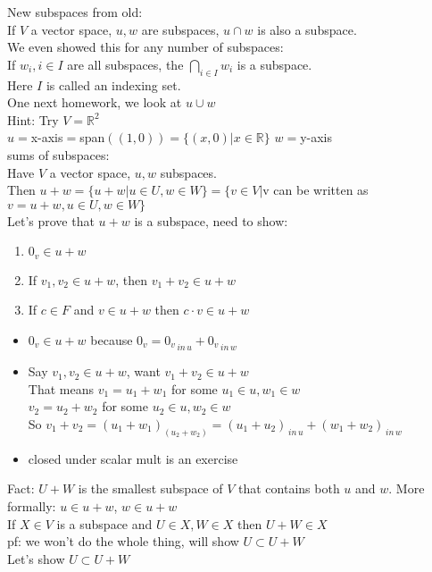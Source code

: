 \documentclass[11pt]{article}
\begin{document}
\doublespacing
New subspaces from old:\\
If $V$ a vector space, $u,w$ are subspaces, $u\cap w$ is also a subspace. \\
We even showed this for any number of subspaces:\\
If $w_i, i\in I$ are all subspaces, the $\bigcap\limits_{i\in I}w_i$ is a subspace.\\
Here $I$ is called an indexing set.\\

One next homework, we look at $u\cup w$\\
Hint: Try $V=\mathbb{R}^2$\\
$u=$x-axis$=$span$((1,0))=\{(x,0)|x\in \mathbb{R}\}$
$w=$y-axis\\
sums of subspaces:\\
Have $V$ a vector space, $u, w$ subspaces. \\
Then $u+w=\{u+w|u\in U, w\in W\}=\{v\in V|$v can be written as $v=u+w, u\in U, w\in W\}$\\
Let's prove that $u+w$ is a subspace, need to show:
\begin{enumerate}
	\item $0_v\in u+w$
	\item If $v_1, v_2\in u+w$, then $v_1+v_2\in u+w$
	\item If $c\in F$ and $v\in u+w$ then $c\cdot v\in u+w$
\end{enumerate}
\begin{itemize}
	\item $0_v\in u+w$ because $0_v = {0_v}_{\, in\, u}+{0_v}_{\, in\, w}$
	\item Say $v_1, v_2\in u+w$, want $v_1+v_2\in u+w$\\
	That means $v_1=u_1+w_1$ for some $u_1\in u, w_1\in w$\\
	$v_2=u_2+w_2$ for some $u_2\in u, w_2\in w$\\
	So $v_1+v_2=(u_1+w_1)_(u_2+w_2)=(u_1+u_2)_{\, in\, u}+(w_1+w_2)_{\, in\, w}$\\
	\item closed under scalar mult is an exercise
\end{itemize}
Fact: $U+W$ is the smallest subspace of $V$ that contains both $u$ and $w$. More formally: $u\in u+w$, $w\in u+w$\\
If $X\in V$ is a subspace and $U\in X, W\in X$ then $U+W\in X$\\
pf: we won't do the whole thing, will show $U\subset U+W$\\
Let's show $U\subset U+W$\\
\end{document}

